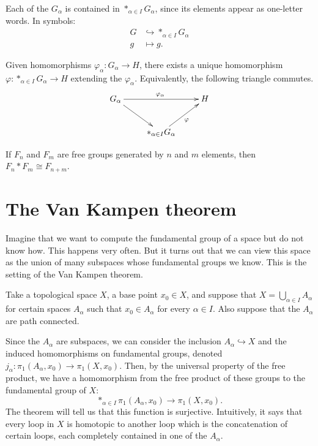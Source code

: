 \begin{remark}
Each of the $G_\alpha$ is contained in
$\ast_{\alpha\in I}G_\alpha$, since its
elements appear as
one-letter words. In symbols:
$$
\begin{aligned}
G&\hookrightarrow\ast_{\alpha\in I}G_\alpha\\
g&\mapsto g.
\end{aligned}
$$
\end{remark}

\begin{theorem}
Given homomorphisms
$\varphi_\alpha:G_\alpha\to H$, there
exists a unique homomorphism
$\varphi:\ast_{\alpha\in I}G_\alpha\to H$
extending the
$\varphi_\alpha$.  Equivalently, the
following
triangle commutes.
$$
\xymatrix{
G_\alpha \ar[rr]^{\varphi_\alpha}
  \ar[dr]
  && H \\
  & \displaystyle
    \ast_{\alpha\in I}G_\alpha
    \ar[ur]_{\varphi}
}
$$
\end{theorem}

\begin{example}
If $F_n$ and $F_m$ are free groups generated
by $n$ and $m$
elements, then $F_n*F_m\cong F_{n+m}$.
\end{example}
\section{The Van Kampen theorem}
\label{section-van-kampen}

Imagine that we want to compute the
fundamental group of a
space but do not know how. This happens very
often. But it
turns out that we can view this space as the
union of many
subspaces whose fundamental groups we know.
This is the
setting of the Van Kampen theorem.

Take a topological space $X$, a base point
$x_0\in X$, and
suppose that $X=\bigcup_{\alpha\in
I}A_\alpha$ for certain
spaces $A_\alpha$ such that $x_0\in A_\alpha$
for every
$\alpha\in I$. Also suppose that the
$A_\alpha$ are path
connected.

Since the $A_\alpha$ are subspaces, we can
consider the
inclusion $A_\alpha\hookrightarrow X$ and the
induced
homomorphisms on fundamental groups, denoted
$j_\alpha:\pi_1(A_\alpha,x_0)
\longrightarrow\pi_1(X,x_0)$.
Then, by the
universal property of the free product, we
have a
homomorphism from the free product of these
groups to the
fundamental group of $X$:
$$
\ast_{\alpha\in I}\pi_1(A_\alpha,x_0)
\to
\pi_1(X,x_0).
$$
The theorem will tell us that this function
is surjective.
Intuitively, it says that every loop in $X$
is homotopic to
another loop which is the concatenation of
certain loops,
each completely contained in one of the
$A_\alpha$.

